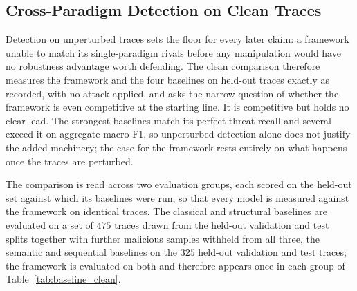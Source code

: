 \documentclass[%
    BCOR=10mm,
    DIV=13,
    toc=bibliography,
    toc=listof,
    oneside,
    12pt,
]{scrbook}
\begin{document}
\subsection{Cross-Paradigm Detection on Clean Traces}
\label{subsec:cross_paradigm}

Detection on unperturbed traces sets the floor for every later claim: a framework
unable to match its single-paradigm rivals before any manipulation would have no
robustness advantage worth defending. The clean comparison therefore measures the
framework and the four baselines on held-out traces exactly as recorded, with no
attack applied, and asks the narrow question of whether the framework is even
competitive at the starting line. It is competitive but holds no clear lead. The
strongest baselines match its perfect threat recall and several exceed it on
aggregate macro-F1, so unperturbed detection alone does not justify the added
machinery; the case for the framework rests entirely on what happens once the
traces are perturbed.

The comparison is read across two evaluation groups, each scored on the held-out
set against which its baselines were run, so that every model is measured against
the framework on identical traces. The classical and structural baselines are
evaluated on a set of $475$ traces drawn from the held-out validation and test
splits together with further malicious samples withheld from all three, the
semantic and sequential baselines on the $325$ held-out validation and test
traces; the framework is evaluated on both and therefore appears once in each
group of Table~\ref{tab:baseline_clean}.
\end{document}
